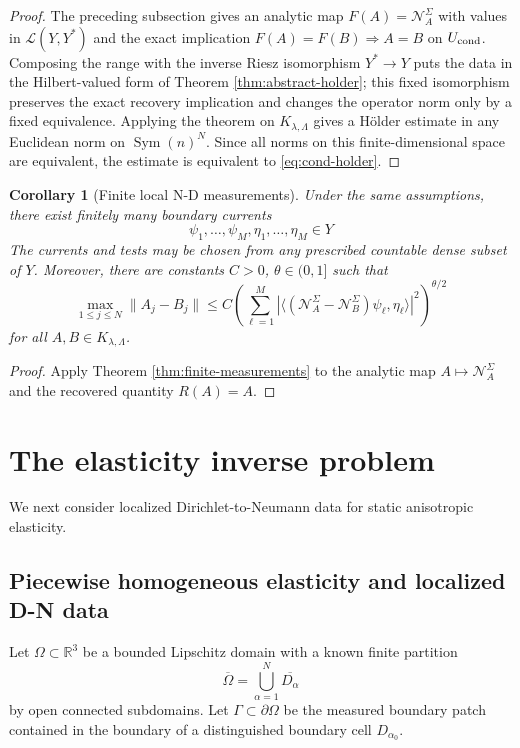 \documentclass[12pt,oneside]{amsart}
\newtheorem{corollary}[theorem]{Corollary}
\newcommand{\R}{\mathbb R}
\newcommand{\cL}{\mathcal L}
\newcommand{\cN}{\mathcal N}
\newcommand{\Sym}{\operatorname{Sym}}
\newcommand{\dual}[2]{\langle #1,#2\rangle}
\begin{document}
\begin{proof}
The preceding subsection gives an analytic map $F(A)=\cN_A^\Sigma$ with values
in $\cL(Y,Y^*)$ and the exact implication $F(A)=F(B)\Rightarrow A=B$ on
$U_{\rm cond}$.  Composing the range with the inverse Riesz isomorphism
$Y^*\to Y$ puts the data in the Hilbert-valued form of Theorem
\ref{thm:abstract-holder}; this fixed isomorphism preserves the exact recovery
implication and changes the operator norm only by a fixed equivalence.  Applying
the theorem on $K_{\lambda,\Lambda}$ gives a H\"older estimate in any Euclidean
norm on $\Sym(n)^N$.  Since all norms on this finite-dimensional space are
equivalent, the estimate is equivalent to \eqref{eq:cond-holder}.
\end{proof}

\begin{corollary}[Finite local N-D measurements]\label{cor:cond-finite}
Under the same assumptions, there exist finitely many boundary currents
\[
        \psi_1,\ldots,\psi_M,
        \eta_1,\ldots,\eta_M\in Y
\]
The currents and tests may be chosen from any prescribed countable dense subset
of $Y$.  Moreover, there are constants $C>0$, $\theta\in(0,1]$ such that
\[
        \max_{1\le j\le N}\|A_j-B_j\|
        \le C
        \left(\sum_{\ell=1}^M
        \left|
        \dual{(\cN_A^\Sigma-\cN_B^\Sigma)\psi_\ell}{\eta_\ell}
        \right|^2\right)^{\theta/2}
\]
for all $A,B\in K_{\lambda,\Lambda}$.
\end{corollary}

\begin{proof}
Apply Theorem \ref{thm:finite-measurements} to the analytic map $A\mapsto\cN_A^\Sigma$ and the recovered quantity $R(A)=A$.
\end{proof}

\section{The elasticity inverse problem}\label{sec:elasticity}

We next consider localized Dirichlet-to-Neumann data for static anisotropic elasticity.

\subsection{Piecewise homogeneous elasticity and localized D-N data}\label{subsec:elasticity-data}

Let $\Omega\subset\R^3$ be a bounded Lipschitz domain with a known finite partition
\[
        \overline\Omega=\bigcup_{\alpha=1}^N\overline{D_\alpha}
\]
by open connected subdomains.  Let $\Gamma\subset\partial\Omega$ be the measured boundary patch contained in the boundary of a distinguished boundary cell $D_{\alpha_0}$.
\end{document}
